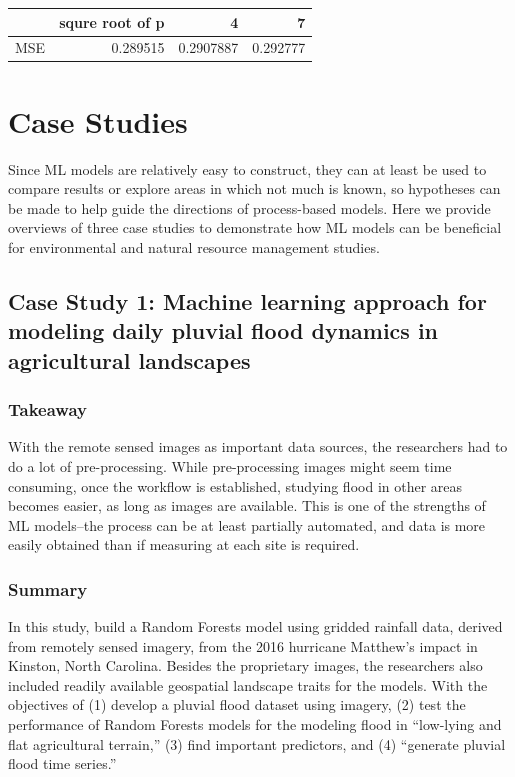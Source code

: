 \documentclass[
]{book}
\begin{document}
\begin{tabular}{l|r|r|r}
\hline
  & squre root of p & 4 & 7\\
\hline
MSE & 0.289515 & 0.2907887 & 0.292777\\
\hline
\end{tabular}

\hypertarget{case-studies}{%
\chapter{Case Studies}\label{case-studies}}

Since ML models are relatively easy to construct, they can at least be used to compare results or explore areas in which not much is known, so hypotheses can be made to help guide the directions of process-based models. Here we provide overviews of three case studies to demonstrate how ML models can be beneficial for environmental and natural resource management studies.

\hypertarget{case-study-1-machine-learning-approach-for-modeling-daily-pluvial-flood-dynamics-in-agricultural-landscapes}{%
\section{Case Study 1: Machine learning approach for modeling daily pluvial flood dynamics in agricultural landscapes}\label{case-study-1-machine-learning-approach-for-modeling-daily-pluvial-flood-dynamics-in-agricultural-landscapes}}

\hypertarget{takeaway}{%
\subsection{Takeaway}\label{takeaway}}

With the remote sensed images as important data sources, the researchers had to do a lot of pre-processing. While pre-processing images might seem time consuming, once the workflow is established, studying flood in other areas becomes easier, as long as images are available. This is one of the strengths of ML models--the process can be at least partially automated, and data is more easily obtained than if measuring at each site is required.

\hypertarget{summary}{%
\subsection{Summary}\label{summary}}

In this study, \citet{fidan2023} build a Random Forests model using gridded rainfall data, derived from remotely sensed imagery, from the 2016 hurricane Matthew's impact in Kinston, North Carolina. Besides the proprietary images, the researchers also included readily available geospatial landscape traits for the models. With the objectives of (1) develop a pluvial flood dataset using imagery, (2) test the performance of Random Forests models for the modeling flood in ``low-lying and flat agricultural terrain,'' (3) find important predictors, and (4) ``generate pluvial flood time series.''
\end{document}
